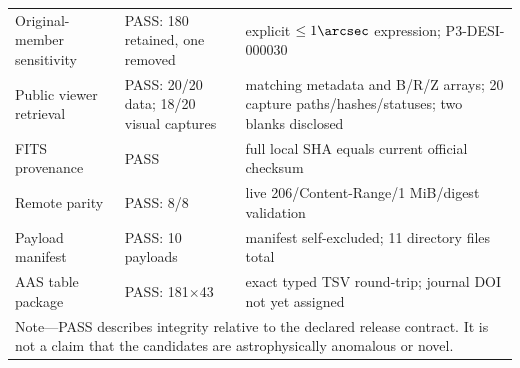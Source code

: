 \documentclass[twocolumn,linenumbers]{aastex702}
\begin{document}
\begin{center}
\begin{tabular}{p{}p{}p{}}
Original-member sensitivity & PASS: 180 retained, one removed & explicit $\le1\arcsec$ expression; P3-DESI-000030 \\
Public viewer retrieval & PASS: 20/20 data; 18/20 visual captures & matching metadata and B/R/Z arrays; 20 capture paths/hashes/statuses; two blanks disclosed \\
FITS provenance & PASS & full local SHA equals current official checksum \\
Remote parity & PASS: 8/8 & live 206/Content-Range/1 MiB/digest validation \\
Payload manifest & PASS: 10 payloads & manifest self-excluded; 11 directory files total \\
AAS table package & PASS: 181$\times$43 & exact typed TSV round-trip; journal DOI not yet assigned \\
\bottomrule
\multicolumn{3}{p{0.88\textwidth}}{\footnotesize Note---PASS describes integrity relative to the
declared release contract. It is not a claim that the candidates are astrophysically anomalous
or novel.}\\
\end{tabular}
\end{center}
\end{document}

